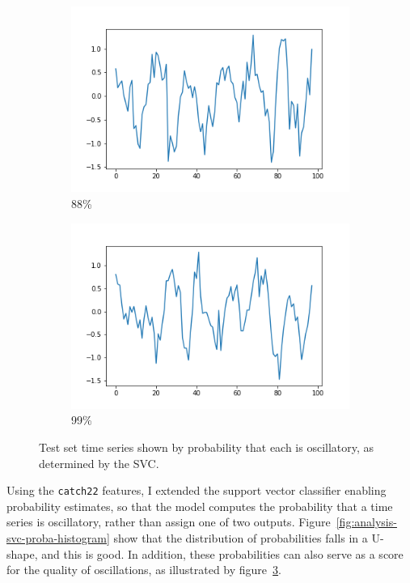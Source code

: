 \begin{figure}
  \begin{subfigure}[t]{0.45\textwidth}
  \centering
    \includegraphics[width=\linewidth]{proba_88}
    \caption{
      88\%
    }
    \label{fig:analysis-svc-proba-88}
  \end{subfigure}%
  \begin{subfigure}[t]{0.45\textwidth}
  \centering
    \includegraphics[width=\linewidth]{proba_99}
    \caption{
      99\%
    }
    \label{fig:analysis-svc-proba-99}
  \end{subfigure}
  \caption{
    Test set time series shown by probability that each is oscillatory, as determined by the SVC.
  }
  \label{fig:analysis-svc-proba-gallery}
\end{figure}

Using the \texttt{catch22} features, I extended the support vector classifier enabling probability estimates, so that the model computes the probability that a time series is oscillatory, rather than assign one of two outputs.
Figure~\ref{fig:analysis-svc-proba-histogram} show that the distribution of probabilities falls in a U-shape, and this is good.
In addition, these probabilities can also serve as a score for the quality of oscillations, as illustrated by figure~\ref{fig:analysis-svc-proba-gallery}.

